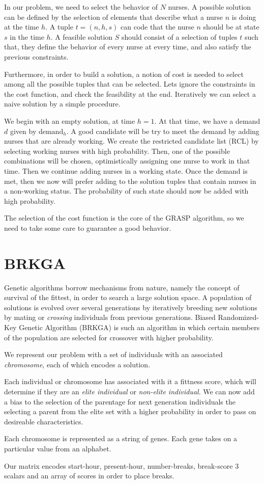 \documentclass[12pt,a4paper]{article}
\begin{document}
In our problem, we need to select the behavior of $N$ nurses. A possible solution
can be defined by the selection of elements that describe what a nurse $n$ is
doing at the time $h$. A tuple $t = (n, h, s)$ can code that the nurse $n$
should be at state $s$ in the time $h$. A feasible solution $S$ should consist
of a selection of tuples $t$ such that, they define the behavior of every nurse
at every time, and also satisfy the previous constraints.

Furthermore, in order to build a solution, a notion of cost is needed to select
among all the possible tuples that can be selected. Lets ignore the constraints
in the cost function, and check the feasibility at the end. Iteratively we can
select a naive solution by a simple procedure.


We begin with an empty solution, at time $h = 1$. At that time, we have a demand $d$ given by
$\textrm{demand}_h$. A good candidate will be try to meet the demand by adding nurses that are already working. We create the restricted candidate list (RCL) by selecting working nurses with high probability. Then, one of the possible
combinations will be chosen, optimistically assigning one nurse to work in that time.
Then we continue adding nurses in a working state. Once the demand is met, then
we now will prefer adding to the solution tuples that contain nurses in a
non-working status. The probability of such state should now be added with high
probability.

The selection of the cost function is the core of the GRASP algorithm, so we
need to take some care to guarantee a good behavior.

\section{BRKGA}
%
Genetic algorithms borrow mechanisms from nature, namely the concept of survival of the fittest, in order to search a large solution space. A population of solutions is evolved over several generations by iteratively breeding new solutions by mating or \textit{crossing} individuals from previous generations. Biased Randomized-Key Genetic Algorithm (BRKGA) is such an algorithm in which certain members of the population are selected for crossover with higher probability.

We represent our problem with a set of individuals with an associated \textit{chromosome}, each of which encodes
a solution.

Each individual or chromosome has associated with it a fittness score, which will determine if they are an \textit{elite individual} or \textit{non-elite individual}. We can now add a bias to the selection of the parentage for next generation individuals the selecting a parent from the elite set with a higher probability in order to pass on desireable characteristics.

Each chromosome is represented as a string of genes. Each gene takes on a particular value
from an alphabet.

Our matrix encodes start-hour, present-hour, number-breaks, break-score
3 scalars and an array of scores in order to place breaks.

\end{document}
